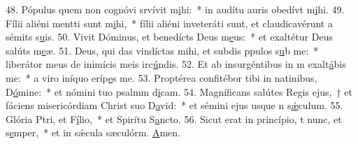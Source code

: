 48. Pópulus quem non cognóvi srvívit m\uline{i}hi:~* in audítu auris obedívt m\uline{i}hi.
49. Fílii aliéni mentti sunt m\uline{i}hi,~* fílii aliéni inveteráti sunt, et claudicavérunt a sémits s\uline{u}is.
50. Vivit Dóminus, et benedícts Deus m\uline{e}us:~* et exaltétur Deus salúts m\uline{e}æ.
51. Deus, qui das vindíctas mihi, et subdis ppulos s\uline{u}b me:~* liberátor meus de inimícis meis irc\uline{ú}ndis.
52. Et ab insurgéntibus in m exalt\uline{á}bis me:~* a viro iníquo eríp\uline{e}s me.
53. Proptérea confitébor tibi in natinibus, D\uline{ó}mine:~* et nómini tuo psalmm d\uline{i}cam.
54. Magníficans salútes Regis ejus,~† et fáciens misericórdiam Christ suo D\uline{a}vid:~* et sémini ejus usque n s\uline{ǽ}culum.
55. Glória Ptri, et F\uline{í}lio,~* et Spirítu S\uline{a}ncto.
56. Sicut erat in princípio, t nunc, et s\uline{e}mper,~* et in sǽcula sæculórm. \uline{A}men.
